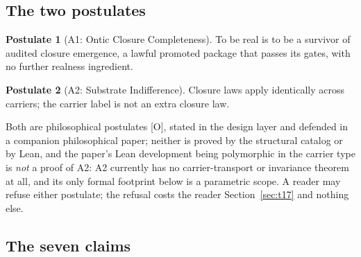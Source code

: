\documentclass[11pt]{article}
\newcommand{\gradeO}{\textsf{[O]}}
\theoremstyle{definition}
\newtheorem{postulate}{Postulate}
\begin{document}
\subsection{The two postulates}

\begin{postulate}[A1: Ontic Closure Completeness]
\label{post:a1}
To be real is to be a survivor of audited closure emergence, a lawful
promoted package that passes its gates, with no further realness
ingredient.
\end{postulate}

\begin{postulate}[A2: Substrate Indifference]
\label{post:a2}
Closure laws apply identically across carriers; the carrier label is not an
extra closure law.
\end{postulate}

Both are philosophical postulates \gradeO, stated in the design layer and
defended in a companion philosophical paper; neither is proved by the
structural catalog or by Lean, and the paper's Lean development being
polymorphic in the carrier type is \emph{not} a proof of A2: A2 currently
has no carrier-transport or invariance theorem at all, and its only formal
footprint below is a parametric scope. A reader may refuse either postulate;
the refusal costs the reader Section~\ref{sec:t17} and nothing else.

\subsection{The seven claims}
\end{document}
